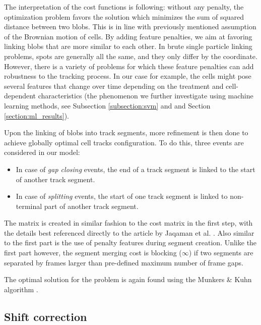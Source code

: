 \documentclass[pdftex,12pt,a4paper]{report}
\begin{document}
The interpretation of the cost functions is following: without any penalty, the optimization problem favors the solution which minimizes the sum of squared distance between two blobs. This is in line with previously mentioned assumption of the Brownian motion of cells. By adding feature penalties, we aim at favoring linking blobs that are more similar to each other. In brute single particle linking problems, spots are generally all the same, and they only differ by the coordinate. However, there is a variety of problems for which these feature penalties can add robustness to the tracking process. In our case for example, the cells might pose several features that change over time depending on the treatment and cell-dependent characteristics (the phenomenon we further investigate using machine learning methods, see Subsection \ref{subsection:svm} and and Section \ref{section:ml_results}).


Upon the linking of blobs into track segments, more refinement is then done to achieve globally optimal cell tracks configuration. To do this, three events are considered in our model:

\begin{itemize}
\item In case of \textit{gap closing} events, the end of a track segment is linked to the start of another track segment.
\item In case of \textit{splitting} events, the start of one track segment is linked to non-terminal part of another track segment.
\end{itemize}

The matrix is created in similar fashion to the cost matrix in the first step, with the details best referenced directly to the article by Jaqaman et al. \cite{jaqaman2008robust}. Also similar to the first part is the use of penalty features during segment creation. Unlike the first part however, the segment merging cost is blocking ($\infty$) if two segments are separated by frames larger than pre-defined maximum number of frame gaps.

The optimal solution for the problem is again found using the Munkers \& Kuhn algorithm \cite{munkres1957algorithms}.

\subsection{Shift correction}
\label{subsection:shift_correction}
\end{document}
